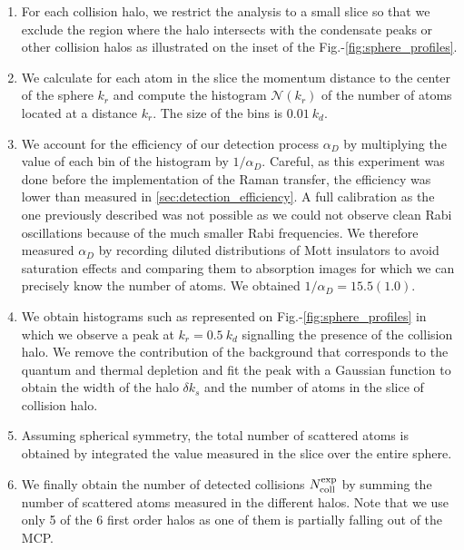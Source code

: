 \begin{enumerate}
    \item For each collision halo, we restrict the analysis to a small slice so that we exclude the region where the halo intersects with the condensate peaks or other collision halos as illustrated on the inset of the Fig.-\ref{fig:sphere_profiles}. 
    \item We calculate for each atom in the slice the momentum distance to the center of the sphere $k_r$ and compute the histogram $\mathcal{N}(k_r)$ of the number of atoms located at a distance $k_r$. The size of the bins is $0.01 \ k_d$.
    \item We account for the efficiency of our detection process $\alpha_D$ by multiplying the value of each bin of the histogram by $1/\alpha_D$. Careful, as this experiment was done before the implementation of the Raman transfer, the efficiency was lower than measured in \ref{sec:detection_efficiency}. A full calibration as the one previously described was not possible as we could not observe clean Rabi oscillations because of the much smaller Rabi frequencies. We therefore measured $\alpha_D$ by recording diluted distributions of Mott insulators to avoid saturation effects and comparing them to absorption images for which we can precisely know the number of atoms. We obtained $1/\alpha_D=15.5(1.0)$.
    \item We obtain histograms such as represented on Fig.-\ref{fig:sphere_profiles} in which we observe a peak at $k_r=0.5 \ k_d$ signalling the presence of the collision halo. We remove the contribution of the background that corresponds to the quantum and thermal depletion and fit the peak with a Gaussian function to obtain the width of the halo $\delta k_s$ and the number of atoms in the slice of collision halo.
    \item Assuming spherical symmetry, the total number of scattered atoms is obtained by integrated the value measured in the slice over the entire sphere. 
    \item We finally obtain the number of detected collisions $N_{\rm{coll}}^{\rm{exp}}$ by summing the number of scattered atoms measured in the different halos. Note that we use only 5 of the 6 first order halos as one of them is partially falling out of the MCP. 
\end{enumerate}

